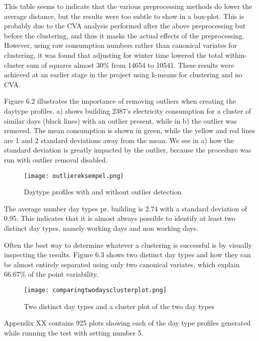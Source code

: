 This table seems to indicate that the various preprocessing methods do lower the average distance, but the results were too subtle to show in a box-plot. This is probably due to the CVA analysis performed after the above preprocessing but before the clustering, and thus it masks the actual effects of the preprocessing. However, using raw consumption numbers rather than canonical variates for clustering, it was found that adjusting for winter time lowered the total within-cluster sum of squares almost 30\% from 14654 to 10541. These results were achieved at an earlier stage in the project using k-means for clustering and no CVA.

Figure 6.2 illustrates the importance of removing outliers when creating the daytype profiles. a) shows building 2387’s electricity consumption for a cluster of similar days (black lines) with an outlier present, while in b) the outlier was removed. The mean consumption is shown in green, while the yellow and red lines are 1 and 2 standard deviations away from the mean. We see in a) how the standard deviation is greatly impacted by the outlier, because the procedure was run with outlier removal disabled.
\begin{figure}
\begin{center}
\texttt{[image: outliereksempel.png]}
\end{center}
\caption{Daytype profiles with and without outlier detection}
\end{figure}

The average number day types pr. building is 2.74 with a standard deviation of 0.95. This indicates that it is almost always possible to identify at least two distinct day types, namely working days and non working days. 

Often the best way to determine whatever a clustering is successful is by visually inspecting the results. Figure 6.3 shows two distinct day types and how they can be almost entirely separated using only two canonical variates, which explain 66.67\% of the point variability.
\begin{figure}
\begin{center}
\texttt{[image: comparingtwodaysclusterplot.png]}
\end{center}
\caption{Two distinct day types and a cluster plot of the two day types}
\end{figure}

Appendix XX contains 925 plots showing each of the day type profiles generated while running the test with setting number 5.

